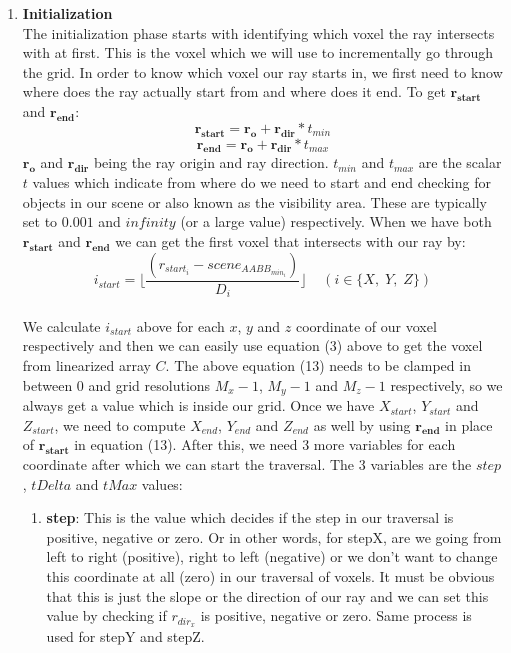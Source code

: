 \documentclass[11pt,a4paper]{article}
\begin{document}
\begin{enumerate}
\item \textbf{Initialization}
\\ The initialization phase starts with identifying which voxel the ray intersects with at first. This is the voxel which we will use to incrementally go through the grid. In order to know which voxel our ray starts in, we first need to know where does the ray actually start from and where does it end. To get $\boldsymbol{r_{start}}$ and $\boldsymbol{r_{end}}$:
\begin{equation}
\boldsymbol{r_{start}} = \boldsymbol{r_{o}} + \boldsymbol{r_{dir}} * t_{min}
\end{equation}
\begin{equation}
\boldsymbol{r_{end}} = \boldsymbol{r_{o}} + \boldsymbol{r_{dir}} * t_{max}
\end{equation}
$\boldsymbol{r_{o}}$ and $\boldsymbol{r_{dir}}$ being the ray origin and ray direction. $t_{min}$ and $t_{max}$ are the scalar $t$ values which indicate from where do we need to start and end checking for objects in our scene or also known as the visibility area. These are typically set to $0.001$ and $infinity$ (or a large value) respectively. When we have both $\boldsymbol{r_{start}}$ and $\boldsymbol{r_{end}}$ we can get the first voxel that intersects with our ray by:
 \begin{equation}
i_{start} = \lfloor \frac{(r_{start_{i}} - scene_{AABB_{min_{i}}})}{D_{i}} \rfloor \;\;\;\; (i \in \{X,\;Y,\;Z\})
\end{equation}
\\
We calculate $i_{start}$ above for each $x$, $y$ and $z$ coordinate of our voxel respectively and then we can easily use equation (3) above to get the voxel from linearized array $C$. The above equation (13) needs to be clamped in between $0$ and grid resolutions $M_{x} - 1$, $M_{y} - 1$ and $M_{z} - 1$ respectively, so we always get a value which is inside our grid. Once we have $X_{start}$, $Y_{start}$ and $Z_{start}$, we need to compute $X_{end}$, $Y_{end}$ and $Z_{end}$ as well by using $\boldsymbol{r_{end}}$ in place of $\boldsymbol{{r_{start}}}$ in equation (13). After this, we need 3 more variables for each coordinate after which we can start the traversal. The 3 variables are the $step$, $tDelta$ and $tMax$ values:
\begin{enumerate}
\item \textbf{step}: This is the value which decides if the step in our traversal is positive, negative or zero. Or in other words, for stepX, are we going from left to right (positive), right to left (negative) or we don't want to change this coordinate at all (zero) in our traversal of voxels. It must be obvious that this is just the slope or the direction of our ray and we can set this value by checking if $r_{dir_{x}}$ is positive, negative or zero. Same process is used for stepY and stepZ.

\end{enumerate}
\end{enumerate}
\end{document}
